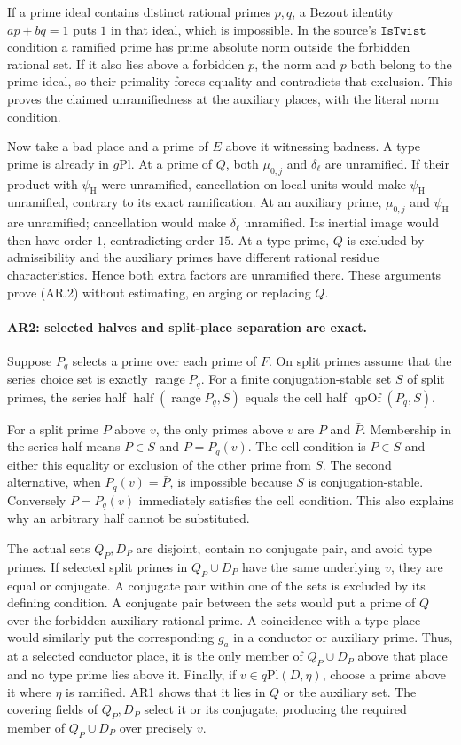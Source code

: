 If a prime ideal contains distinct rational primes $p,q$, a Bezout identity
$ap+bq=1$ puts $1$ in that ideal, which is impossible. In the source's
$\texttt{IsTwist}$ condition a ramified prime has prime absolute norm
outside the forbidden rational set. If it also lies above a forbidden
$p$, the norm and $p$ both belong to the prime ideal, so their primality
forces equality and contradicts that exclusion. This proves the claimed
unramifiedness at the auxiliary places, with the literal norm condition.

Now take a bad place and a prime of $E$ above it witnessing badness.
A type prime is already in $g\mathrm{Pl}$. At a prime of $Q$, both
$\mu_{0,j}$ and $\delta_\ell$ are unramified. If their product with
$\psi_{\mathrm H}$ were unramified, cancellation on local units would
make $\psi_{\mathrm H}$ unramified, contrary to its exact ramification.
At an auxiliary prime, $\mu_{0,j}$ and $\psi_{\mathrm H}$ are
unramified; cancellation would make $\delta_\ell$ unramified. Its
inertial image would then have order $1$, contradicting order $15$.
At a type prime, $Q$ is excluded by admissibility and the auxiliary
primes have different rational residue characteristics. Hence both
extra factors are unramified there. These arguments prove (AR.2)
without estimating, enlarging or replacing $Q$.

\paragraph{AR2: selected halves and split-place separation are exact.}
Suppose $P_q$ selects a prime over each prime of $F$. On split primes
assume that the series choice set is exactly $\operatorname{range}P_q$.
For a finite conjugation-stable set $S$ of split primes,
the series half $\operatorname{half}(\operatorname{range}P_q,S)$ equals
the cell half $\operatorname{qpOf}(P_q,S)$.

For a split prime $P$ above $v$, the only primes above $v$ are $P$ and
$\bar P$. Membership in the series half means $P\in S$ and
$P=P_q(v)$. The cell condition is $P\in S$ and either this equality
or exclusion of the other prime from $S$. The second alternative,
when $P_q(v)=\bar P$, is impossible because $S$ is conjugation-stable.
Conversely $P=P_q(v)$ immediately satisfies the cell condition.
This also explains why an arbitrary half cannot be substituted.

The actual sets $Q_P,D_P$ are disjoint, contain no conjugate pair, and
avoid type primes. If selected split primes in $Q_P\cup D_P$ have the
same underlying $v$, they are equal or conjugate. A conjugate pair
within one of the sets is excluded by its defining condition. A
conjugate pair between the sets would put a prime of $Q$ over the
forbidden auxiliary rational prime. A coincidence with a type place
would similarly put the corresponding $g_a$ in a conductor or
auxiliary prime. Thus, at a selected conductor place, it is the only
member of $Q_P\cup D_P$ above that place and no type prime lies above it.
Finally, if $v\in q\mathrm{Pl}(D,\eta)$, choose a prime above it where
$\eta$ is ramified. AR1 shows that it lies in $Q$ or the auxiliary set.
The covering fields of $Q_P,D_P$ select it or its conjugate, producing
the required member of $Q_P\cup D_P$ over precisely $v$.

